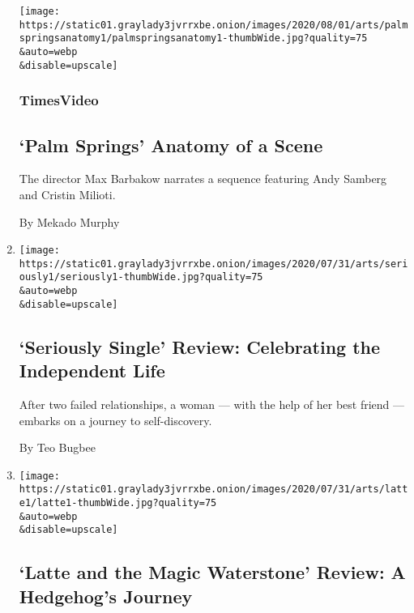 \begin{enumerate}
  \texttt{[image: https://static01.graylady3jvrrxbe.onion/images/2020/08/01/arts/palmspringsanatomy1/palmspringsanatomy1-thumbWide.jpg?quality=75\\\&auto=webp\\\&disable=upscale]}

  \hypertarget{timesvideo}{%
  \subsubsection{TimesVideo}\label{timesvideo}}

  \hypertarget{palm-springs--anatomy-of-a-scene}{%
  \subsection{`Palm Springs' \textbar{} Anatomy of a
  Scene}\label{palm-springs--anatomy-of-a-scene}}

  The director Max Barbakow narrates a sequence featuring Andy Samberg
  and Cristin Milioti.

  By Mekado Murphy
\item
  \href{/2020/07/31/movies/seriously-single-review.html}{}

  \texttt{[image: https://static01.graylady3jvrrxbe.onion/images/2020/07/31/arts/seriously1/seriously1-thumbWide.jpg?quality=75\\\&auto=webp\\\&disable=upscale]}

  \hypertarget{seriously-single-review-celebrating-the-independent-life}{%
  \subsection{`Seriously Single' Review: Celebrating the Independent
  Life}\label{seriously-single-review-celebrating-the-independent-life}}

  After two failed relationships, a woman --- with the help of her best
  friend --- embarks on a journey to self-discovery.

  By Teo Bugbee
\item
  \href{/2020/07/31/movies/latte-and-the-magic-waterstone-review.html}{}

  \texttt{[image: https://static01.graylady3jvrrxbe.onion/images/2020/07/31/arts/latte1/latte1-thumbWide.jpg?quality=75\\\&auto=webp\\\&disable=upscale]}

  \hypertarget{latte-and-the-magic-waterstone-review-a-hedgehogs-journey}{%
  \subsection{`Latte and the Magic Waterstone' Review: A Hedgehog's
  Journey}\label{latte-and-the-magic-waterstone-review-a-hedgehogs-journey}}


\end{enumerate}
